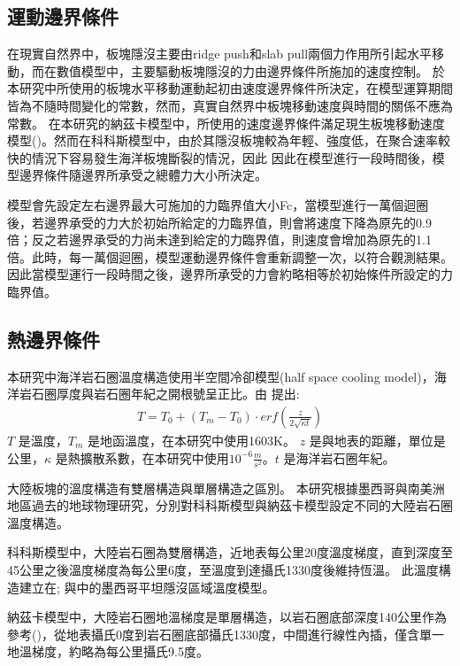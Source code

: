 \subsection{運動邊界條件}
在現實自然界中，板塊隱沒主要由ridge push和slab pull兩個力作用所引起水平移動，而在數值模型中，主要驅動板塊隱沒的力由邊界條件所施加的速度控制。
於本研究中所使用的板塊水平移動運動起初由速度邊界條件所決定，在模型運算期間皆為不隨時間變化的常數，然而，真實自然界中板塊移動速度與時間的關係不應為常數。
在本研究的納茲卡模型中，所使用的速度邊界條件滿足現生板塊移動速度模型(\citealp{schellart2008global})。然而在科科斯模型中，由於其隱沒板塊較為年輕、強度低，在聚合速率較快的情況下容易發生海洋板塊斷裂的情況，因此
因此在模型進行一段時間後，模型邊界條件隨邊界所承受之總體力大小所決定。

模型會先設定左右邊界最大可施加的力臨界值大小Fc，當模型進行一萬個迴圈後，若邊界承受的力大於初始所給定的力臨界值，則會將速度下降為原先的0.9倍；反之若邊界承受的力尚未達到給定的力臨界值，則速度會增加為原先的1.1倍。此時，每一萬個迴圈，模型運動邊界條件會重新調整一次，以符合觀測結果。因此當模型運行一段時間之後，邊界所承受的力會約略相等於初始條件所設定的力臨界值。

\subsection{熱邊界條件}
本研究中海洋岩石圈溫度構造使用半空間冷卻模型(half space cooling model)，海洋岩石圈厚度與岩石圈年紀之開根號呈正比。由 \citealp{davis1974}提出:
\begin{align}
T=T_0+(T_m-T_0)\cdot {erf}(\frac{z}{2\sqrt{\kappa t}}) \label{eq:Half Space Model}
\end{align}
$T$ 是溫度，$T_m$ 是地函溫度，在本研究中使用1603K。
$z$ 是與地表的距離，單位是公里，$\kappa$ 是熱擴散系數，在本研究中使用$10^{-6} \frac{m}{s^2}$。$t$ 是海洋岩石圈年紀。

大陸板塊的溫度構造有雙層構造與單層構造之區別。
本研究根據墨西哥與南美洲地區過去的地球物理研究，分別對科科斯模型與納茲卡模型設定不同的大陸岩石圈溫度構造。

科科斯模型中，大陸岩石圈為雙層構造，近地表每公里20度溫度梯度，直到深度至45公里之後溫度梯度為每公里6度，至溫度到達攝氏1330度後維持恆溫。
此溫度構造建立在\citealp{Manea2005}; \citealp{Manea2011Thermal}與\citealp{Manea2011Curie}中的墨西哥平坦隱沒區域溫度模型。

納茲卡模型中，大陸岩石圈地溫梯度是單層構造，以岩石圈底部深度140公里作為參考(\citealp{perez2008})，從地表攝氏0度到岩石圈底部攝氏1330度，中間進行線性內插，僅含單一地溫梯度，約略為每公里攝氏9.5度。

